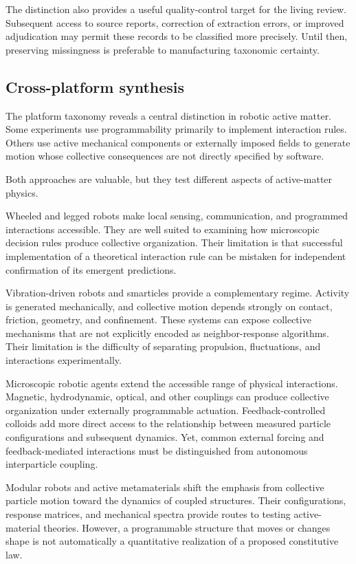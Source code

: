 The distinction also
provides a useful
quality-control target
for the living review.
Subsequent access
to source reports,
correction of extraction
errors, or improved
adjudication may permit
these records to be
classified more precisely.
Until then, preserving
missingness is preferable
to manufacturing
taxonomic certainty.

\subsection{Cross-platform synthesis}
\label{sec:platforms-cross}

The platform taxonomy reveals a central distinction
in robotic active matter. Some experiments use
programmability primarily to implement interaction
rules. Others use active mechanical components
or externally imposed fields to generate motion
whose collective consequences are not directly
specified by software.

Both approaches are valuable, but they test
different aspects of active-matter physics.

Wheeled and legged robots make local sensing,
communication, and programmed interactions
accessible. They are well suited to examining
how microscopic decision rules produce
collective organization. Their limitation
is that successful implementation of
a theoretical interaction rule can
be mistaken for independent confirmation
of its emergent predictions.

Vibration-driven robots and smarticles provide
a complementary regime. Activity is generated
mechanically, and collective motion depends
strongly on contact, friction, geometry,
and confinement. These systems can expose
collective mechanisms that are not explicitly
encoded as neighbor-response algorithms.
Their limitation is the difficulty of
separating propulsion, fluctuations,
and interactions experimentally.

Microscopic robotic agents extend the accessible
range of physical interactions. Magnetic,
hydrodynamic, optical, and other couplings
can produce collective organization under
externally programmable actuation.
Feedback-controlled colloids add more direct
access to the relationship between measured
particle configurations and subsequent
dynamics. Yet, common external forcing
and feedback-mediated interactions must
be distinguished from autonomous
interparticle coupling.

Modular robots and active metamaterials
shift the emphasis from collective
particle motion toward the dynamics
of coupled structures. Their
configurations, response matrices,
and mechanical spectra provide
routes to testing active-material
theories. However, a programmable
structure that moves or changes
shape is not automatically a
quantitative realization of
a proposed constitutive law.

